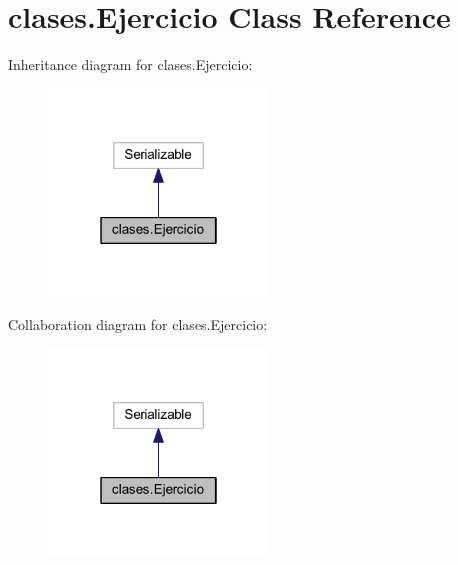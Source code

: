 \hypertarget{classclases_1_1_ejercicio}{}\section{clases.\+Ejercicio Class Reference}
\label{classclases_1_1_ejercicio}


Inheritance diagram for clases.\+Ejercicio\+:
\nopagebreak
\begin{figure}[H]
\begin{center}
\leavevmode
\includegraphics[width=166pt]{classclases_1_1_ejercicio__inherit__graph}
\end{center}
\end{figure}


Collaboration diagram for clases.\+Ejercicio\+:
\nopagebreak
\begin{figure}[H]
\begin{center}
\leavevmode
\includegraphics[width=166pt]{classclases_1_1_ejercicio__coll__graph}
\end{center}
\end{figure}
